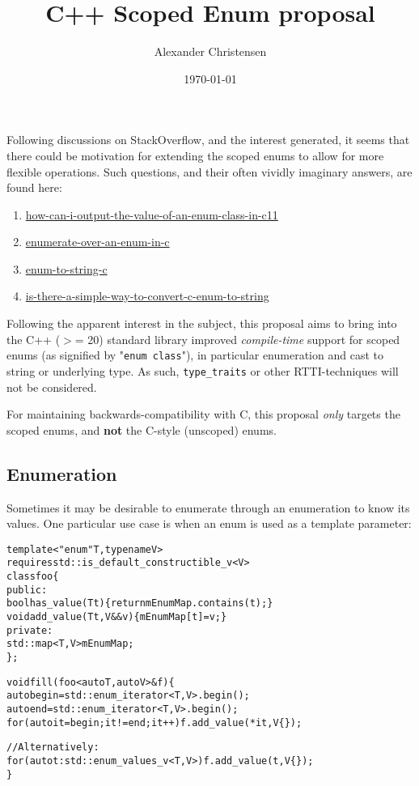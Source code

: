 \documentclass[a4paper, 12pt]{article}
\title{C++ Scoped Enum proposal}
\author{\small Alexander Christensen}
\date{\vspace{-2mm}\small \today}
\begin{document}
\maketitle

Following discussions on StackOverflow, and the interest generated, it seems
that there could be motivation for extending the scoped enums to allow for
more flexible operations. Such questions, and their often vividly imaginary
answers, are found here:

\begin{enumerate}
\item \href{https://stackoverflow.com/questions/11421432/how-can-i-output-the-value-of-an-enum-class-in-c11}{how-can-i-output-the-value-of-an-enum-class-in-c11}
\item \href{https://stackoverflow.com/questions/1390703/enumerate-over-an-enum-in-c}{enumerate-over-an-enum-in-c}
\item \href{https://stackoverflow.com/questions/6281461/enum-to-string-c}{enum-to-string-c}
\item \href{https://stackoverflow.com/questions/201593/is-there-a-simple-way-to-convert-c-enum-to-string}{is-there-a-simple-way-to-convert-c-enum-to-string}
\end{enumerate}

Following the apparent interest in the subject, this proposal aims to bring
into the C++ ($>$= 20) standard library improved \textit{compile-time} support
for scoped enums (as signified by "\texttt{enum class}"), in particular
enumeration and cast to string or underlying type. As such, \texttt{type\_traits}
or other RTTI-techniques will not be considered.

For maintaining backwards-compatibility with C, this proposal \textit{only}
targets the scoped enums, and \textbf{not} the C-style (unscoped) enums.


\subsection{Enumeration}

Sometimes it may be desirable to enumerate through an enumeration to know its
values. One particular use case is when an enum is used as a template parameter:

\begin{alltt}\footnotesize
template<"enum" T, typename V>
requires std::is\_default\_constructible\_v<V>
class foo \{
public:
  bool has\_value(T t) \{ return mEnumMap.contains(t); \}
  void add\_value(T t, V&& v) \{ mEnumMap[t] = v; \}
private:
  std::map<T, V> mEnumMap;
\};

void fill(foo<auto T, auto V>& f) \{
  auto begin = std::enum\_iterator<T, V>.begin();
  auto end = std::enum\_iterator<T, V>.begin();
  for (auto it = begin; it != end; it++) { f.add\_value(*it, V\{\}); }

  // Alternatively:
  for (auto t : std::enum\_values\_v<T, V>) { f.add\_value(t, V\{\}); }
\}
\end{alltt}
\end{document}
